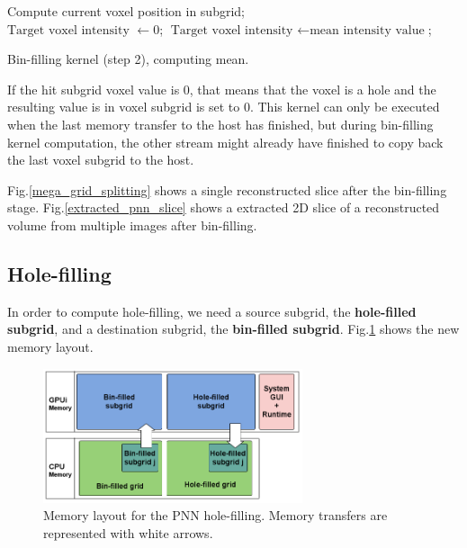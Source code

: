 \documentclass[12pt,journal,compsoc]{IEEEtran}
\begin{document}
\begin{algorithm}
\vspace{0.2cm}
Compute current voxel position in subgrid;\\
%
{$\text{Target voxel intensity }\gets 0$;}%
{$\text{Target voxel intensity }\gets \text{mean intensity value}$;}

\caption{Bin-filling kernel (step 2), computing mean.}
\label{compute_mean_kernel}
\end{algorithm}

If the hit subgrid voxel value is 0, that means that the voxel is a hole and the resulting value is in voxel subgrid is set to 0.
This kernel can only be executed when the last memory transfer to the host has finished, but during bin-filling kernel computation, the other stream might already have finished to copy back the last voxel subgrid to the host.\par
Fig.\ref{mega_grid_splitting} shows a single reconstructed slice after the bin-filling stage. Fig.\ref{extracted_pnn_slice} shows a extracted 2D slice of a reconstructed volume from multiple images after bin-filling.

\subsection{Hole-filling}

In order to compute hole-filling, we need a source subgrid, the \textbf{hole-filled subgrid}, and a destination subgrid, the \textbf{bin-filled subgrid}. Fig.\ref{hole_filling_memory} shows the new memory layout.

\begin{figure}[ht!]
\centering
\includegraphics[width=3.0in]{hole_filling_memory}
\caption{Memory layout for the PNN hole-filling. Memory transfers are represented with white arrows.}
\label{hole_filling_memory}
\end{figure}
\end{document}
